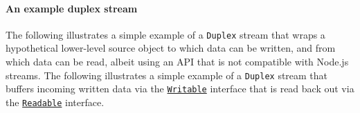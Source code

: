 \paragraph{An example duplex stream}\label{an-example-duplex-stream}

The following illustrates a simple example of a \texttt{Duplex} stream
that wraps a hypothetical lower-level source object to which data can be
written, and from which data can be read, albeit using an API that is
not compatible with Node.js streams. The following illustrates a simple
example of a \texttt{Duplex} stream that buffers incoming written data
via the \hyperref[class-streamwritable]{\texttt{Writable}} interface
that is read back out via the
\hyperref[class-streamreadable]{\texttt{Readable}} interface.

\begin{Shaded}
\begin{Highlighting}[]
\OperatorTok{=} \NormalTok{(}\NormalTok{)}\OperatorTok{;}
\OperatorTok{=} \NormalTok{(}\NormalTok{)}\OperatorTok{;}

  \OperatorTok{,}
    \OperatorTok{;}
    \NormalTok{[kSource] }\OperatorTok{=}\OperatorTok{;}
\NormalTok{  \}}

  \OperatorTok{,}\OperatorTok{,}
    \NormalTok{ (}
\OperatorTok{=}\NormalTok{()}\OperatorTok{;}
    \NormalTok{[kSource]}\OperatorTok{;}
    \NormalTok{()}\OperatorTok{;}
\NormalTok{  \}}

    \NormalTok{[kSource]}\OperatorTok{,}\OperatorTok{,}\KeywordTok{=\textgreater{}}\NormalTok{ \{}
      \NormalTok{(}\OperatorTok{,}\OperatorTok{;}
\NormalTok{    \})}\OperatorTok{;}
\NormalTok{  \}}
\NormalTok{\}}
\end{Highlighting}
\end{Shaded}

